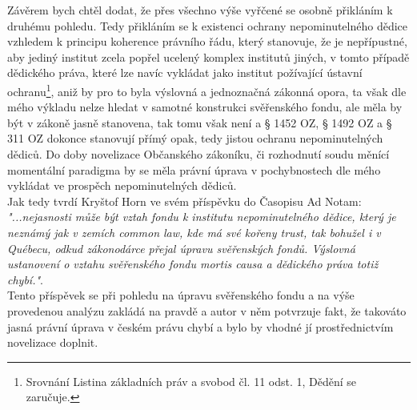 \documentclass{article}
\begin{document}
Závěrem bych chtěl dodat, že přes všechno výše vyřčené se osobně přikláním k druhému pohledu. Tedy přikláním se k existenci ochrany nepominutelného dědice vzhledem k principu koherence právního řádu, který stanovuje, že je nepřípustné, aby jediný institut zcela popřel ucelený komplex institutů jiných, v tomto případě dědického práva, které lze navíc vykládat jako institut požívající ústavní ochranu\footnote{Srovnání Listina základních práv a svobod čl. 11 odst. 1, Dědění se zaručuje.}, aniž by pro to byla výslovná a jednoznačná zákonná opora, ta však dle mého výkladu nelze hledat v samotné konstrukci svěřenského fondu, ale měla by být v zákoně jasně stanovena, tak tomu však není a § 1452 OZ, § 1492 OZ a § 311 OZ dokonce stanovují přímý opak, tedy jistou ochranu nepominutelných dědiců. Do doby novelizace Občanského zákoníku, či rozhodnutí soudu měnící momentální paradigma by se měla právní úprava v pochybnostech dle mého vykládat ve prospěch nepominutelných dědiců.\\



Jak tedy tvrdí Kryštof Horn ve svém příspěvku do Časopisu Ad Notam: \textit{"...nejasnosti může být vztah fondu k institutu nepominutelného dědice, který je neznámý jak v zemích common law, kde má své kořeny trust, tak bohužel i v Québecu, odkud zákonodárce přejal úpravu svěřenských fondů. Výslovná ustanovení o vztahu svěřenského fondu mortis causa a dědického práva totiž chybí."}.  \\

Tento příspěvek se při pohledu na úpravu svěřenského fondu a na výše provedenou analýzu zakládá na pravdě a autor v něm potvrzuje fakt, že takováto jasná právní úprava v českém právu chybí a bylo by vhodné jí prostřednictvím novelizace doplnit.\\
\end{document}
